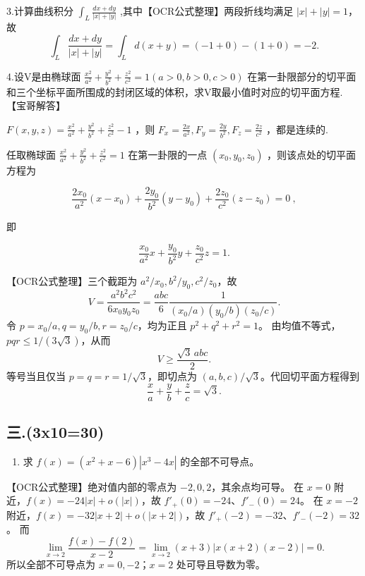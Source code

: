 \documentclass[11pt,fontset=fandol]{ctexart}
\providecommand{\tightlist}{\setlength{\itemsep}{0pt}\setlength{\parskip}{0pt}}
\begin{document}
3.计算曲线积分
\(\int _ { L } { \frac { d x + d y } { \left| x \right| + \left| y \right| } }\)
,其中【OCR公式整理】两段折线均满足 \(|x|+|y|=1\)，故 \[
\int_L\frac{dx+dy}{|x|+|y|}
=\int_Ld(x+y)=(-1+0)-(1+0)=-2.
\]

4.设V是由椭球面
\(\frac { x ^ { 2 } } { a ^ { 2 } } + \frac { y ^ { 2 } } { b ^ { 2 } } + \frac { z ^ { 2 } } { c ^ { 2 } } = 1 \left( a > 0 , b > 0 , c > 0 \right)\)
在第一卦限部分的切平面和三个坐标平面所围成的封闭区域的体积，求V取最小值时对应的切平面方程.【宝哥解答】

\(F ( x , y , z ) = \frac { x ^ { 2 } } { a ^ { 2 } } + \frac { y ^ { 2 } } { b ^ { 2 } } + \frac { z ^ { 2 } } { c ^ { 2 } } - 1\)
，则
\(F _ { x } = \frac { 2 x } { a ^ { 2 } } , F _ { y } = \frac { 2 y } { b ^ { 2 } } , F _ { z } = \frac { 2 z } { c ^ { 2 } }\)
，都是连续的.

任取椭球面
\(\frac { x ^ { 2 } } { a ^ { 2 } } + \frac { y ^ { 2 } } { b ^ { 2 } } + \frac { z ^ { 2 } } { c ^ { 2 } } = 1\)
在第一卦限的一点 \(( x _ { 0 } , y _ { 0 } , z _ { 0 } )\)
，则该点处的切平面方程为

\[
\frac { 2 x _ { 0 } } { a ^ { 2 } } ( x - x _ { 0 } ) + \frac { 2 y _ { 0 } } { b ^ { 2 } } ( y - y _ { 0 } ) + \frac { 2 z _ { 0 } } { c ^ { 2 } } ( z - z _ { 0 } ) = 0 \ ,
\]

即

\[
\frac { x _ { 0 } } { a ^ { 2 } } x + \frac { y _ { 0 } } { b ^ { 2 } } y + \frac { z _ { 0 } } { c ^ { 2 } } z = 1 .
\]

【OCR公式整理】三个截距为 \(a^2/x_0,b^2/y_0,c^2/z_0\)，故 \[
V=\frac{a^2b^2c^2}{6x_0y_0z_0}
=\frac{abc}{6}\frac1{(x_0/a)(y_0/b)(z_0/c)}.
\] 令 \(p=x_0/a,q=y_0/b,r=z_0/c\)，均为正且 \(p^2+q^2+r^2=1\)。
由均值不等式，\(pqr\le1/(3\sqrt3)\)，从而 \[
V\ge\frac{\sqrt3\,abc}{2}.
\] 等号当且仅当 \(p=q=r=1/\sqrt3\)，即切点为
\((a,b,c)/\sqrt3\)。代回切平面方程得到 \[
\frac xa+\frac yb+\frac zc=\sqrt3.
\]

\subsection{三.(3x10=30)}\label{ux4e09.3x1030}

\begin{enumerate}
\def\labelenumi{\arabic{enumi}.}
\tightlist
\item
  求 \(f(x)=(x^2+x-6)|x^3-4x|\) 的全部不可导点。
\end{enumerate}

【OCR公式整理】绝对值内部的零点为 \(-2,0,2\)，其余点均可导。 在 \(x=0\)
附近，\(f(x)=-24|x|+o(|x|)\)，故 \(f'_+(0)=-24\)、\(f'_-(0)=24\)。 在
\(x=-2\) 附近，\(f(x)=-32|x+2|+o(|x+2|)\)，故
\(f'_+(-2)=-32\)、\(f'_-(-2)=32\)。 而 \[
\lim_{x\to2}\frac{f(x)-f(2)}{x-2}
=\lim_{x\to2}(x+3)|x(x+2)(x-2)|=0.
\] 所以全部不可导点为 \(x=0,-2\)；\(x=2\) 处可导且导数为零。
\end{document}
